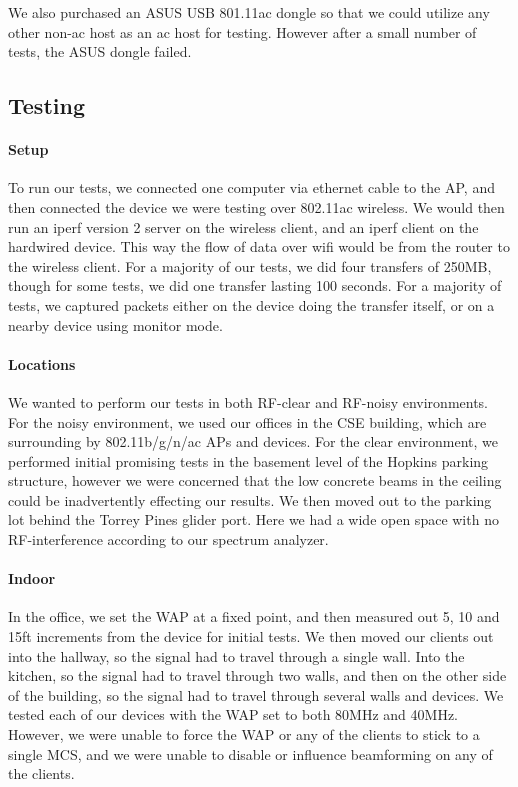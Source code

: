 We also purchased an ASUS USB 801.11ac dongle so that we could
utilize any other non-ac host as an ac host for testing. However after a small
number of tests, the ASUS dongle failed.

\subsection{Testing}

\paragraph{Setup}
To run our tests, we connected one computer via ethernet cable to the AP, and
then connected the device we were testing over 802.11ac wireless. We would then
run an iperf version 2  server on the wireless client, and
an iperf client on the hardwired device. This way the flow of data over wifi
would be from the router to the wireless client. For a majority of our tests, we
did four transfers of 250MB, though for some tests, we did one transfer lasting
100 seconds. For a majority of tests, we captured packets either on the device
doing the transfer itself, or on a nearby device using monitor mode.

\paragraph{Locations}
We wanted to perform our tests in both RF-clear and RF-noisy environments. For
the noisy environment, we used our offices in the CSE building, which are
surrounding by 802.11b/g/n/ac APs and devices. For the clear environment, we
performed initial promising tests in the basement level of the Hopkins parking
structure, however we were concerned that the low concrete beams in the ceiling
could be inadvertently effecting our results. We then moved out to the parking
lot behind the Torrey Pines glider port. Here we had a wide open space with no
RF-interference according to our spectrum analyzer.


\paragraph{Indoor}
In the office, we set the WAP at a fixed point, and then measured out 5, 10 and
15ft increments from the device for initial tests. We then moved our clients out
into the hallway, so the signal had to travel through a single wall. Into the
kitchen, so the signal had to travel through two walls, and then on the other
side of the building, so the signal had to travel through several walls and
devices. We tested each of our devices with the WAP set to both 80MHz and 40MHz.
However, we were unable to force the WAP or any of the clients to stick to a
single MCS, and we were unable to disable or influence beamforming on any of the
clients.


